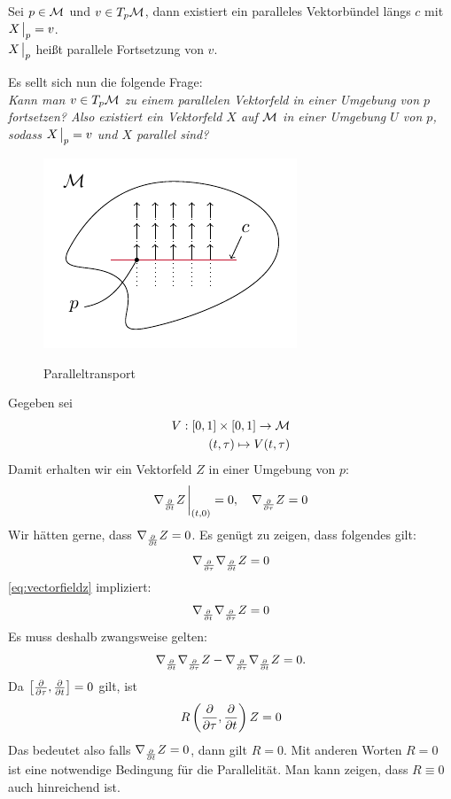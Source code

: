 \begin{defs}
Sei $p \in \mathcal{M}$ und $v \in T_p \mathcal{M}$, dann existiert ein paralleles Vektorbündel längs $c$ mit $X\eval_p = v$.\\
$X\eval_p$ heißt parallele Fortsetzung von $v$.
\end{defs}
Es sellt sich nun die folgende Frage:\\
\textit{Kann man $v \in T_p \mathcal{M}$ zu einem parallelen Vektorfeld in einer Umgebung von $p$ fortsetzen?
Also existiert ein Vektorfeld $X$ auf $\mathcal{M}$ in einer Umgebung $U$ von $p$, sodass $X\eval_p = v$ und $X$ parallel sind?}
\begin{figure}[H]
\centering
\includegraphics[width=0.6\linewidth]{figures/tikz/parallel_transport.pdf}
\label{img:parallel_transport}
\caption{Paralleltransport}
\end{figure} 
Gegeben sei 
\begin{align}
V: [0, 1] \times [0, 1] \to \mathcal{M}\\
(t, \tau) \mapsto V(t, \tau)
\end{align}
Damit erhalten wir ein Vektorfeld $Z$ in einer Umgebung von $p$:
\begin{align}
\label{eq:vectorfieldz}
\nabla_{\pdv{t}} Z \eval_{(t, 0)} = 0, \quad \nabla_{\pdv{\tau}} Z = 0
\end{align}
Wir hätten gerne, dass $\nabla_{\pdv{t}} Z = 0$.
Es genügt zu zeigen, dass folgendes gilt:
\begin{align}
\nabla_{\pdv{\tau}}\nabla_{\pdv{t}} Z = 0
\end{align}
\ref{eq:vectorfieldz} impliziert:
\begin{align}
\nabla_{\pdv{t}}\nabla_{\pdv{\tau}} Z = 0
\end{align}
Es muss deshalb zwangsweise gelten:
\begin{align}
\nabla_{\pdv{t}}\nabla_{\pdv{\tau}} Z - \nabla_{\pdv{\tau}}\nabla_{\pdv{t}} Z = 0.
\end{align}
Da $\comm{\pdv{\tau}}{\pdv{t}} = 0$ gilt, ist 
\begin{align}
R \left( \pdv{\tau}, \pdv{t} \right) Z = 0
\end{align} 
Das bedeutet also falls $\nabla_{\pdv{t}}Z = 0$, dann gilt $R=0$.
Mit anderen Worten $R=0$ ist eine notwendige Bedingung für die Parallelität.
Man kann zeigen, dass $R \equiv 0$ auch hinreichend ist.\\

